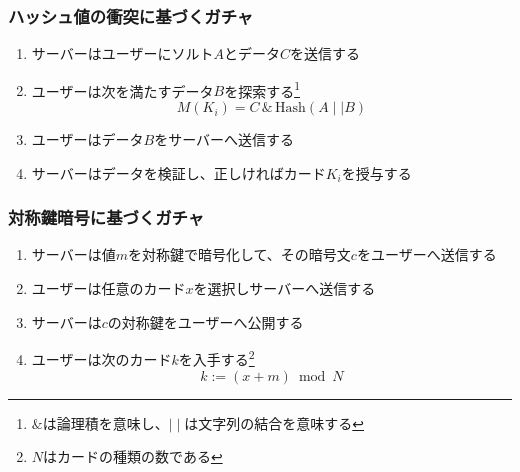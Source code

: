 \begin{frame}
  \frametitle{ハッシュ値の衝突に基づくガチャ\cite{hash}}

  \begin{enumerate}
    \item<2-> サーバーはユーザーにソルト$A$とデータ$C$を送信する
    \item<3-> ユーザーは次を満たすデータ$B$を探索する\footnote[frame]{$\&$は論理積を意味し、$\mid\mid$は文字列の結合を意味する}
      \[
        M(K_i) = C\, \&\, \text{Hash}(A \mid\mid B)
      \]
    \item<4-> ユーザーはデータ$B$をサーバーへ送信する
    \item<5-> サーバーはデータを検証し、正しければカード$K_i$を授与する
  \end{enumerate}

\end{frame}

\begin{frame}
  \frametitle{対称鍵暗号に基づくガチャ\cite{mala}}

  \begin{enumerate}
    \item<2-> 
      \label{enum:encryption}
      サーバーは値$m$を対称鍵で暗号化して、その暗号文$c$をユーザーへ送信する
    \item<3-> ユーザーは任意のカード$x$を選択しサーバーへ送信する
    \item<4->
      \label{enum:opening}
      サーバーは$c$の対称鍵をユーザーへ公開する
    \item<5-> ユーザーは次のカード$k$を入手する\footnote[frame]{$N$はカードの種類の数である}
      \[
        k := (x + m) \bmod N
      \]
  \end{enumerate}

\end{frame}


